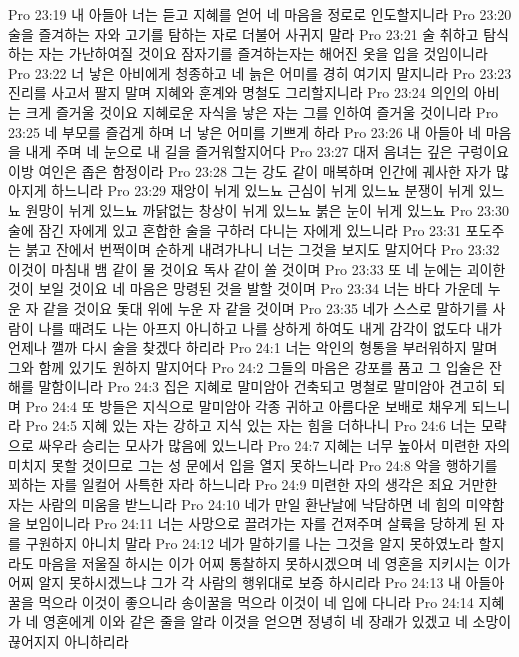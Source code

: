 Pro 23:19  내 아들아 너는 듣고 지혜를 얻어 네 마음을 정로로 인도할지니라
Pro 23:20  술을 즐겨하는 자와 고기를 탐하는 자로 더불어 사귀지 말라
Pro 23:21  술 취하고 탐식하는 자는 가난하여질 것이요 잠자기를 즐겨하는자는 해어진 옷을 입을 것임이니라
Pro 23:22  너 낳은 아비에게 청종하고 네 늙은 어미를 경히 여기지 말지니라
Pro 23:23  진리를 사고서 팔지 말며 지혜와 훈계와 명철도 그리할지니라
Pro 23:24  의인의 아비는 크게 즐거울 것이요 지혜로운 자식을 낳은 자는 그를 인하여 즐거울 것이니라
Pro 23:25  네 부모를 즐겁게 하며 너 낳은 어미를 기쁘게 하라
Pro 23:26  내 아들아 네 마음을 내게 주며 네 눈으로 내 길을 즐거워할지어다
Pro 23:27  대저 음녀는 깊은 구렁이요 이방 여인은 좁은 함정이라
Pro 23:28  그는 강도 같이 매복하며 인간에 궤사한 자가 많아지게 하느니라
Pro 23:29  재앙이 뉘게 있느뇨 근심이 뉘게 있느뇨 분쟁이 뉘게 있느뇨 원망이 뉘게 있느뇨 까닭없는 창상이 뉘게 있느뇨 붉은 눈이 뉘게 있느뇨
Pro 23:30  술에 잠긴 자에게 있고 혼합한 술을 구하러 다니는 자에게 있느니라
Pro 23:31  포도주는 붉고 잔에서 번쩍이며 순하게 내려가나니 너는 그것을 보지도 말지어다
Pro 23:32  이것이 마침내 뱀 같이 물 것이요 독사 같이 쏠 것이며
Pro 23:33  또 네 눈에는 괴이한 것이 보일 것이요 네 마음은 망령된 것을 발할 것이며
Pro 23:34  너는 바다 가운데 누운 자 같을 것이요 돛대 위에 누운 자 같을 것이며
Pro 23:35  네가 스스로 말하기를 사람이 나를 때려도 나는 아프지 아니하고 나를 상하게 하여도 내게 감각이 없도다 내가 언제나 깰까 다시 술을 찾겠다 하리라
Pro 24:1  너는 악인의 형통을 부러워하지 말며 그와 함께 있기도 원하지 말지어다
Pro 24:2  그들의 마음은 강포를 품고 그 입술은 잔해를 말함이니라
Pro 24:3  집은 지혜로 말미암아 건축되고 명철로 말미암아 견고히 되며
Pro 24:4  또 방들은 지식으로 말미암아 각종 귀하고 아름다운 보배로 채우게 되느니라
Pro 24:5  지혜 있는 자는 강하고 지식 있는 자는 힘을 더하나니
Pro 24:6  너는 모략으로 싸우라 승리는 모사가 많음에 있느니라
Pro 24:7  지혜는 너무 높아서 미련한 자의 미치지 못할 것이므로 그는 성 문에서 입을 열지 못하느니라
Pro 24:8  악을 행하기를 꾀하는 자를 일컬어 사특한 자라 하느니라
Pro 24:9  미련한 자의 생각은 죄요 거만한 자는 사람의 미움을 받느니라
Pro 24:10  네가 만일 환난날에 낙담하면 네 힘의 미약함을 보임이니라
Pro 24:11  너는 사망으로 끌려가는 자를 건져주며 살륙을 당하게 된 자를 구원하지 아니치 말라
Pro 24:12  네가 말하기를 나는 그것을 알지 못하였노라 할지라도 마음을 저울질 하시는 이가 어찌 통찰하지 못하시겠으며 네 영혼을 지키시는 이가 어찌 알지 못하시겠느냐 그가 각 사람의 행위대로 보증 하시리라
Pro 24:13  내 아들아 꿀을 먹으라 이것이 좋으니라 송이꿀을 먹으라 이것이 네 입에 다니라
Pro 24:14  지혜가 네 영혼에게 이와 같은 줄을 알라 이것을 얻으면 정녕히 네 장래가 있겠고 네 소망이 끊어지지 아니하리라
